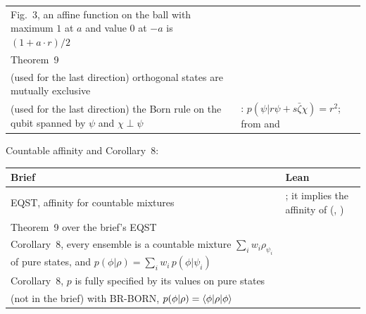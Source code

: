 \documentclass[11pt]{article}
\begin{document}
\begin{center}
\begin{tabularx}{\textwidth}{@{}BL@{}}
Fig.~3, an affine function on the ball with maximum $1$ at $a$ and value $0$ at $-a$ is
  $(1 + a\cdot r)/2$ &  \\
Theorem~9 &  \\
(used for the last direction) orthogonal states are mutually exclusive &
   \\
(used for the last direction) the Born rule on the qubit spanned by $\psi$ and $\chi \perp \psi$
  & : $p(\psi | r\psi + s\bar\zeta\chi) = r^2$; from
   and  \\
\bottomrule
\end{tabularx}
\end{center}

\noindent Countable affinity and Corollary~8:
\begin{center}
\begin{tabularx}{\textwidth}{@{}BL@{}}
\toprule
Brief & Lean \\
\midrule
EQST, affinity for countable mixtures & ; it implies the affinity of
   (,
  ) \\
Theorem~9 over the brief's EQST &  \\
Corollary~8, every ensemble is a countable mixture $\sum_i w_i\rho_{\psi_i}$ of pure states, and
  $p(\phi|\rho) = \sum_i w_i\,p(\phi|\psi_i)$ &  \\
Corollary~8, $p$ is fully specified by its values on pure states &
   \\
(not in the brief) with BR-BORN, $p(\phi|\rho) = \braket{\phi|\rho|\phi}$ &
   \\
\bottomrule
\end{tabularx}
\end{center}
\end{document}
